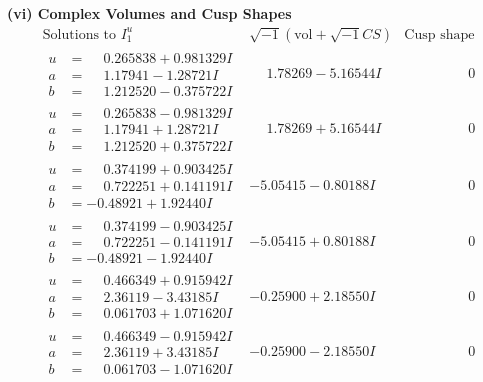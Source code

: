 \documentclass[1p]{elsarticle_modified}
\theoremstyle{definition}
\newcommand{\I}{\sqrt{-1}}
\begin{document}
\newpage\flushleft \textbf{(vi) Complex Volumes and Cusp Shapes}
$$\begin{array}{c|c|c}  
\text{Solutions to }I^u_{1}& \I (\text{vol} + \sqrt{-1}CS) & \text{Cusp shape}\\
 \hline 
\begin{aligned}
u &= \phantom{-}0.265838 + 0.981329 I \\
a &= \phantom{-}1.17941 - 1.28721 I \\
b &= \phantom{-}1.212520 - 0.375722 I\end{aligned}
 & \phantom{-}1.78269 - 5.16544 I & \phantom{-0.000000 } 0 \\ \hline\begin{aligned}
u &= \phantom{-}0.265838 - 0.981329 I \\
a &= \phantom{-}1.17941 + 1.28721 I \\
b &= \phantom{-}1.212520 + 0.375722 I\end{aligned}
 & \phantom{-}1.78269 + 5.16544 I & \phantom{-0.000000 } 0 \\ \hline\begin{aligned}
u &= \phantom{-}0.374199 + 0.903425 I \\
a &= \phantom{-}0.722251 + 0.141191 I \\
b &= -0.48921 + 1.92440 I\end{aligned}
 & -5.05415 - 0.80188 I & \phantom{-0.000000 } 0 \\ \hline\begin{aligned}
u &= \phantom{-}0.374199 - 0.903425 I \\
a &= \phantom{-}0.722251 - 0.141191 I \\
b &= -0.48921 - 1.92440 I\end{aligned}
 & -5.05415 + 0.80188 I & \phantom{-0.000000 } 0 \\ \hline\begin{aligned}
u &= \phantom{-}0.466349 + 0.915942 I \\
a &= \phantom{-}2.36119 - 3.43185 I \\
b &= \phantom{-}0.061703 + 1.071620 I\end{aligned}
 & -0.25900 + 2.18550 I & \phantom{-0.000000 } 0 \\ \hline\begin{aligned}
u &= \phantom{-}0.466349 - 0.915942 I \\
a &= \phantom{-}2.36119 + 3.43185 I \\
b &= \phantom{-}0.061703 - 1.071620 I\end{aligned}
 & -0.25900 - 2.18550 I & \phantom{-0.000000 } 0 \\ \hline\begin{aligned}

\end{aligned}
\end{array}$$
\end{document}

